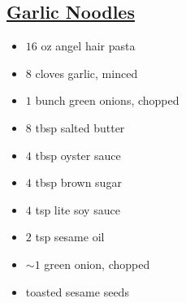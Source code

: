 \documentclass{article}
\begin{document}
\begin{minipage}{\textwidth}
\setlength{\columnseprule}{0.5pt}
\begin{vwcol}[widths={0.6,0.4}, rule=0pt]
\begin{minipage}{0.58\linewidth}
\section*{\underline{Garlic Noodles}}
\ingredients
\vspace{1em}

\begin{minipage}{\textwidth}
\setlength{\columnseprule}{0pt}
\begin{multicols*}{2}
\begin{minipage}{\linewidth}
\ingredients[Noodles]
\vspace{-1em}
\begin{itemize}
    \item $16$ oz angel hair pasta
    \item $8$ cloves garlic, minced
    \item $1$ bunch green onions, chopped
    \item $8$ tbsp salted butter
\end{itemize}
\end{minipage}

\columnbreak
\begin{minipage}{\linewidth}
\ingredients[Sauce]
\vspace{-1em}
\begin{itemize}
    \item $4$ tbsp oyster sauce
    \item $4$ tbsp brown sugar
    \item $4$ tsp lite soy sauce
    \item $2$ tsp sesame oil
\end{itemize}
\end{minipage}
\end{multicols*}
\begin{minipage}{\textwidth}
\ingredients[Garnish]
\vspace{-1em}
\begin{itemize}
    \item $\sim1$ green onion, chopped
    \item toasted sesame seeds
\end{itemize}
\end{minipage}
\end{minipage}
\end{minipage}
\begin{minipage}{0.55\textwidth}
\vspace{1em}


\end{minipage}
\end{vwcol}
\end{minipage}
\end{document}
